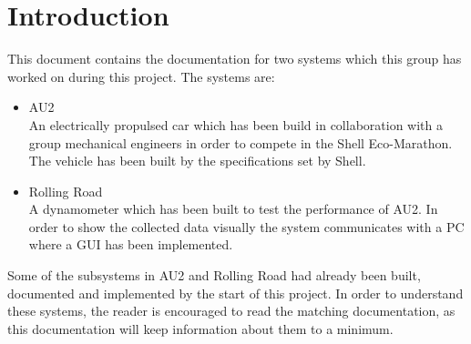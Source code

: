 \chapter{Introduction}
This document contains the documentation for two systems which this group has worked on during this project. The systems are:
\begin{itemize}
	\item{AU2}\\
		An electrically propulsed car which has been build in collaboration with a group mechanical engineers in order to compete in the Shell Eco-Marathon. The vehicle has been built by the specifications set by Shell.
	\item{Rolling Road}\\
		A dynamometer which has been built to test the performance of AU2. In order to show the collected data visually the system communicates with a PC where a GUI has been implemented.
\end{itemize}

Some of the subsystems in AU2 and Rolling Road had already been built, documented and implemented by the start of this project. In order to understand these systems, the reader is encouraged to read the matching documentation, as this documentation will keep information about them to a minimum.
